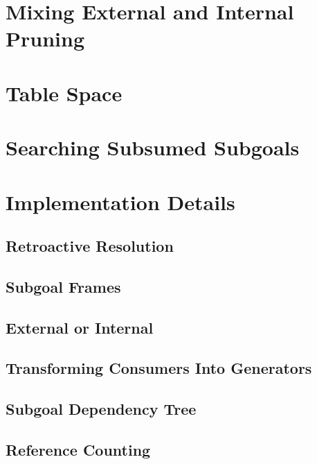\section{Mixing External and Internal Pruning}

\section{Table Space}

\section{Searching Subsumed Subgoals}

\section{Implementation Details}

\subsection{Retroactive Resolution}

\subsection{Subgoal Frames}

\subsection{External or Internal}

\subsection{Transforming Consumers Into Generators}

\subsection{Subgoal Dependency Tree}

\subsection{Reference Counting}